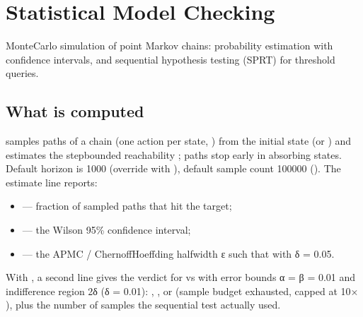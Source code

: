 \documentclass[a4paper,10pt,english]{sphinxmanual}
\begin{document}
\sphinxstepscope


\section{Statistical Model Checking}
\label{\detokenize{manual/smc:statistical-model-checking}}\label{\detokenize{manual/smc::doc}}
\sphinxAtStartPar
Monte\sphinxhyphen{}Carlo simulation of point Markov chains: probability estimation with confidence
intervals, and sequential hypothesis testing (SPRT) for threshold queries.


\subsection{What is computed}
\label{\detokenize{manual/smc:what-is-computed}}
\sphinxAtStartPar
{} samples paths of a  chain (one action per state, ) from
the initial state (or ) and estimates the step\sphinxhyphen{}bounded reachability
; paths stop early in absorbing states. Default horizon is 1000
(override with ), default sample count 100000 (). The
estimate line reports:
\begin{itemize}
\item {} 
\sphinxAtStartPar
{} — fraction of sampled paths that hit the target;

\item {} 
\sphinxAtStartPar
{} — the Wilson 95\% confidence interval;

\item {} 
\sphinxAtStartPar
{} — the APMC / Chernoff\sphinxhyphen{}Hoeffding half\sphinxhyphen{}width ε such that
 with δ = 0.05.

\end{itemize}

\sphinxAtStartPar
With , a second line gives the  verdict for
 vs  with error bounds α = β = 0.01 and indifference
region 2δ (δ = 0.01): , , or  (sample
budget exhausted, capped at 10× ), plus the number of samples the
sequential test actually used.
\end{document}
